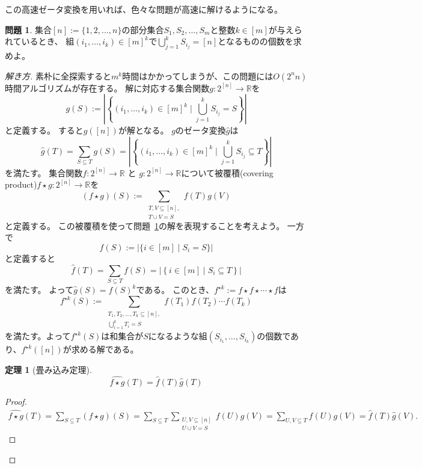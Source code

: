 \documentclass[a4paper,twoside,onecolumn,openany,article,10pt]{memoir}
\newtheorem{theorem}{定理}
\theoremstyle{definition}
\newtheorem{problem}{問題}
\theoremstyle{remark}
\begin{document}
この高速ゼータ変換を用いれば、色々な問題が高速に解けるようになる。
\begin{problem}\label{prob:c}
集合$[n]:=\{1,2,\dotsc,n\}$の部分集合$S_1,S_2,\dotsc,S_m$と整数$k\in[m]$が与えられているとき、
組$(i_1,\dotsc,i_k)\in[m]^k$で$\bigcup_{j=1}^k S_{i_j}=[n]$となるものの個数を求めよ。
\end{problem}
\begin{proof}[解き方]
素朴に全探索すると$m^k$時間はかかってしまうが、この問題には$O(2^nn)$時間アルゴリズムが存在する。
解に対応する集合関数$g\colon 2^{[n]}\to\mathbb{R}$を
\begin{equation*}
g(S):= \left|\left\{(i_1,\dotsc,i_k)\in[m]^k\mid \bigcup_{j=1}^k S_{i_j} = S\right\}\right|
\end{equation*}
と定義する。
すると$g([n])$が解となる。
$g$のゼータ変換$\widehat{g}$は
\begin{equation*}
\widehat{g}(T)= \sum_{S\subseteq T}g(S)=\left|\left\{(i_1,\dotsc,i_k)\in[m]^k\mid \bigcup_{j=1}^k S_{i_j} \subseteq T\right\}\right|
\end{equation*}
を満たす。
集合関数$f\colon 2^{[n]}\to\mathbb{R}$ と $g\colon 2^{[n]}\to \mathbb{R}$について被覆積(covering product)$f\star g\colon 2^{[n]}\to\mathbb{R}$を
\begin{equation*}
(f\star g)(S) := \sum_{\substack{T, V\subseteq[n],\\ T\cup V = S}} f(T) g(V)
\end{equation*}
と定義する。
この被覆積を使って問題~\ref{prob:c}の解を表現することを考えよう。
\fi
一方で
\begin{equation*}
f(S):= \left|\{i\in[m]\mid S_i = S\}\right|
\end{equation*}
と定義すると
\begin{equation*}
\widehat{f}(T) = \sum_{S\subseteq T}f(S) =
\left|\left\{i\in[m] \mid S_i\subseteq T\right\}\right|
\end{equation*}
を満たす。
よって$\widehat{g}(S)=\widehat{f}(S)^k$である。
このとき、$f^{\star k} := f\star f\star \dotsm \star f$は
\begin{equation*}
f^{\star k}(S) := \sum_{\substack{T_1, T_2,\dotsc, T_k\subseteq[n],\\ \bigcup_{i=1}^k T_i = S}} f(T_1)f(T_2)\dotsm f(T_k)
\end{equation*}
を満たす。よって$f^{\star k}(S)$は和集合が$S$になるような組$(S_{i_1},\dotsc,S_{i_k})$の個数であり、$f^{\star k}([n])$が求める解である。


\begin{theorem}[畳み込み定理]
\begin{equation*}
\widehat{f\star g}(T) = \widehat{f}(T)\widehat{g}(T)
\end{equation*}
\end{theorem}
\begin{proof}
\begin{align*}
\widehat{f\star g}(T) = 
\sum_{S\subseteq T} (f\star g)(S)
=
\sum_{S\subseteq T} 
\sum_{\substack{U, V\subseteq [n]\\ U\cup V = S}} f(U) g(V)
=
\sum_{U, V\subseteq T} f(U) g(V)
=\widehat{f}(T)\widehat{g}(V).
\end{align*}
\end{proof}
\fi


\end{proof}
\end{document}
